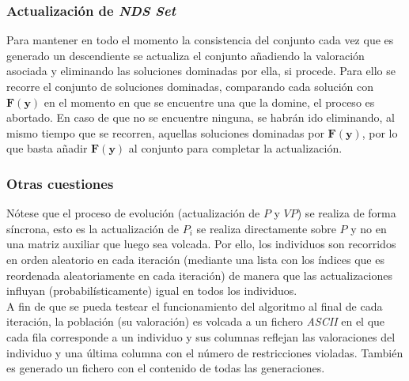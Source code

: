 \subsubsection{Actualización de \textit{NDS Set}}

Para mantener en todo el momento la consistencia del conjunto cada vez que es generado un descendiente se actualiza el conjunto añadiendo la valoración asociada y eliminando las soluciones dominadas por ella, si procede. Para ello se recorre el conjunto de soluciones dominadas, comparando cada solución con $\boldsymbol{F}(\boldsymbol{y})$ en el momento en que se encuentre una que la domine, el proceso es abortado. En caso de que no se encuentre ninguna, se habrán ido eliminando, al mismo tiempo que se recorren, aquellas soluciones dominadas por $\boldsymbol{F}(\boldsymbol{y})$, por lo que basta añadir $\boldsymbol{F}(\boldsymbol{y})$ al conjunto para completar la actualización. \\

\subsubsection{Otras cuestiones}

Nótese que el proceso de evolución (actualización de $P$ y $VP$) se realiza de forma síncrona, esto es la actualización de $P_{i}$ se realiza directamente sobre $P$ y no en una matriz auxiliar que luego sea volcada. Por ello, los individuos son recorridos en orden aleatorio en cada iteración (mediante una lista con los índices que es reordenada aleatoriamente en cada iteración) de manera que las actualizaciones influyan (probabilísticamente) igual en todos los individuos.\\

A fin de que se pueda testear el funcionamiento del algoritmo al final de cada iteración, la población (su valoración) es volcada a un fichero \textit{ASCII} en el que cada fila corresponde a un individuo y sus columnas reflejan las valoraciones del individuo y una última columna con el número de restricciones violadas. También es generado un fichero con el contenido de todas las generaciones.\\




